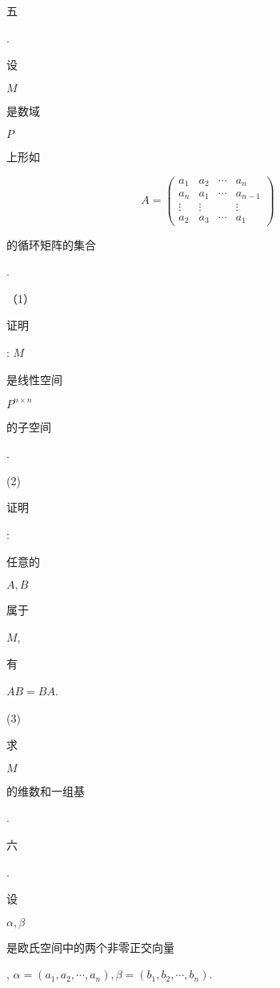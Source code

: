 \documentclass[10pt]{article}
\begin{document}
\begin{CJK}{UTF8}{mj}五\end{CJK}. \begin{CJK}{UTF8}{mj}设\end{CJK} $M$ \begin{CJK}{UTF8}{mj}是数域\end{CJK} $P$ \begin{CJK}{UTF8}{mj}上形如\end{CJK}
$$
A=\left(\begin{array}{cccc}
a_{1} & a_{2} & \cdots & a_{n} \\
a_{n} & a_{1} & \cdots & a_{n-1} \\
\vdots & \vdots & & \vdots \\
a_{2} & a_{3} & \cdots & a_{1}
\end{array}\right)
$$
\begin{CJK}{UTF8}{mj}的循环矩阵的集合\end{CJK}.

（1）\begin{CJK}{UTF8}{mj}证明\end{CJK}: $M$ \begin{CJK}{UTF8}{mj}是线性空间\end{CJK} $P^{n \times n}$ \begin{CJK}{UTF8}{mj}的子空间\end{CJK}.

(2) \begin{CJK}{UTF8}{mj}证明\end{CJK}: \begin{CJK}{UTF8}{mj}任意的\end{CJK} $A, B$ \begin{CJK}{UTF8}{mj}属于\end{CJK} $M$, \begin{CJK}{UTF8}{mj}有\end{CJK} $A B=B A$.

(3) \begin{CJK}{UTF8}{mj}求\end{CJK} $M$ \begin{CJK}{UTF8}{mj}的维数和一组基\end{CJK}. \begin{CJK}{UTF8}{mj}六\end{CJK}. \begin{CJK}{UTF8}{mj}设\end{CJK} $\alpha, \beta$ \begin{CJK}{UTF8}{mj}是欧氏空间中的两个非零正交向量\end{CJK}, $\alpha=\left(a_{1}, a_{2}, \cdots, a_{n}\right), \beta=\left(b_{1}, b_{2}, \cdots, b_{n}\right)$.
\end{document}

